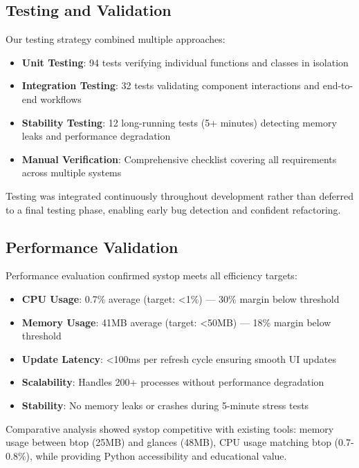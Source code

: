 \documentclass[12pt,a4paper,oneside]{report}
\begin{document}
\subsection{Testing and Validation}

Our testing strategy combined multiple approaches:

\begin{itemize}
    \item \textbf{Unit Testing}: 94 tests verifying individual functions and classes in isolation
    \item \textbf{Integration Testing}: 32 tests validating component interactions and end-to-end workflows
    \item \textbf{Stability Testing}: 12 long-running tests (5+ minutes) detecting memory leaks and performance degradation
    \item \textbf{Manual Verification}: Comprehensive checklist covering all requirements across multiple systems
\end{itemize}

Testing was integrated continuously throughout development rather than deferred to a final testing phase, enabling early bug detection and confident refactoring.

\subsection{Performance Validation}

Performance evaluation confirmed systop meets all efficiency targets:

\begin{itemize}
    \item \textbf{CPU Usage}: 0.7\% average (target: <1\%) --- 30\% margin below threshold
    \item \textbf{Memory Usage}: 41MB average (target: <50MB) --- 18\% margin below threshold
    \item \textbf{Update Latency}: <100ms per refresh cycle ensuring smooth UI updates
    \item \textbf{Scalability}: Handles 200+ processes without performance degradation
    \item \textbf{Stability}: No memory leaks or crashes during 5-minute stress tests
\end{itemize}

Comparative analysis showed systop competitive with existing tools: memory usage between btop (25MB) and glances (48MB), CPU usage matching btop (0.7-0.8\%), while providing Python accessibility and educational value.
\end{document}

